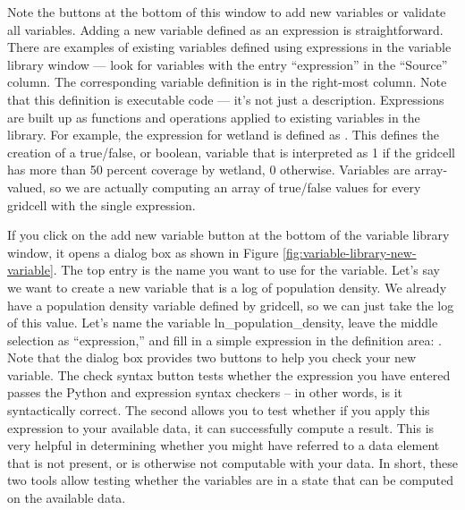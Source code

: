 Note the buttons at the bottom of this window to add new variables or
validate all variables.  Adding a new variable defined as an expression is
straightforward.  There are examples of existing variables defined using
expressions in the variable library window --- look for variables with the
entry ``expression'' in the ``Source'' column.  The corresponding variable
definition is in the right-most column.  Note that this definition is
executable code --- it's not just a description.  Expressions are built up
as functions and operations applied to existing variables in the library.
For example, the expression for wetland is defined as
.  This defines the creation of a
true/false, or boolean, variable that is interpreted as 1 if the gridcell
has more than 50 percent coverage by wetland, 0 otherwise.  Variables are
array-valued, so we are actually computing an array of true/false values
for every gridcell with the single expression.

If you click on the add new variable button at the bottom of the variable
library window, it opens a dialog box as shown in Figure
\ref{fig:variable-library-new-variable}.  The top entry is the name you
want to use for the variable.  Let's say we want to create a new variable
that is a log of population density.  We already have a population density
variable defined by gridcell, so we can just take the log of this value.
Let's name the variable ln\_population\_density, leave the middle selection
as ``expression,'' and fill in a simple expression in the definition
area: .  Note that the dialog box
provides two buttons to help you check your new variable.  The check syntax
button tests whether the expression you have entered passes the Python and
expression syntax checkers -- in other words, is it syntactically correct.
The second allows you to test whether if you apply this expression to your
available data, it can successfully compute a result.  This is very helpful
in determining whether you might have referred to a data element that is
not present, or is otherwise not computable with your data.  In short,
these two tools allow testing whether the variables are in a state that can
be computed on the available data.

